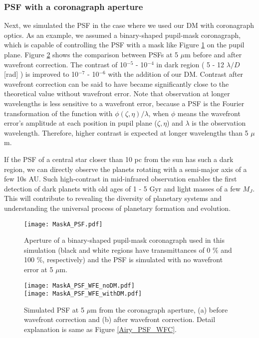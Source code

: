 \documentclass[a4paper]{article}
\begin{document}
\subsubsection{PSF with a coronagraph aperture}
Next, we simulated the PSF in the case where we used our DM with coronagraph optics. As an example, we assumed a binary-shaped pupil-mask coronagraph, which is capable of controlling the PSF with a mask like Figure \ref{coronagraph_mask_PSF} on the pupil plane. Figure \ref{coronagraph_PSF_WFC} shows the comparison between PSFs at 5 $\mu$m before and after wavefront correction. The contrast of 10$^{-5}$ - 10$^{-4}$ in dark region ( 5 - 12 $\lambda/D$ [rad] ) is improved to 10$^{-7}$ - 10$^{-6}$ with the addition of our DM. Contrast after wavefront correction can be said to have became significantly close to the theoretical value without wavefront error. Note that observation at longer wavelengths is less sensitive to a wavefront error, because a PSF is the Fourier transformation of the function with $\phi(\zeta, \eta) / \lambda$, when $\phi$ means the wavefront error's amplitude at each position in pupil plane ($\zeta, \eta$) and $\lambda$ is the observation wavelength. Therefore, higher contrast is expected at longer wavelengths than 5 $\mu$m.

If the PSF of a central star closer than 10 pc from the sun has such a dark region, we can directly observe the planets rotating with a semi-major axis of a few 10s AU. Such high-contrast in mid-infrared observation enables the first detection of dark planets with old ages of 1 - 5 Gyr and light masses of a few $M_{J}$. This will contribute to revealing the diversity of planetary systems and understanding the universal process of planetary formation and evolution.

\begin{figure}[htbp]
\centering
\texttt{[image: MaskA\_PSF.pdf]}
\caption{Aperture of a binary-shaped pupil-mask coronagraph used in this simulation (black and white regions have transmittances of 0 $\%$ and 100 $\%$, respectively) and the PSF is simulated with no wavefront error at 5 $\mu$m.}
\label{coronagraph_mask_PSF}
\end{figure}

\begin{figure}[htbp]
\centering
\texttt{[image: MaskA\_PSF\_WFE\_noDM.pdf]}\\
\texttt{[image: MaskA\_PSF\_WFE\_withDM.pdf]}
\caption{Simulated PSF at 5 $\mu$m from the coronagraph aperture, (a) before wavefront correction and (b) after wavefront correction. Detail explanation is same as Figure \ref{Airy_PSF_WFC}.}
\label{coronagraph_PSF_WFC}
\end{figure}
\end{document}
